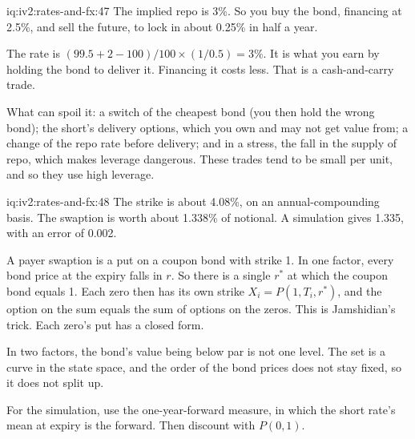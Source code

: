 \begin{solution}{iq:iv2:rates-and-fx:47}
The implied repo is 3\%. So you buy the bond, financing at 2.5\%, and sell the future, to lock in about 0.25\% in half a year.

The rate is $(99.5 + 2 - 100)/100 \times (1/0.5) = 3\%$. It is what you earn by holding the bond to deliver it. Financing it costs less. That is a cash-and-carry trade.

What can spoil it: a switch of the cheapest bond (you then hold the wrong bond); the short's delivery options, which you own and may not get value from; a change of the repo rate before delivery; and in a stress, the fall in the supply of repo, which makes leverage dangerous. These trades tend to be small per unit, and so they use high leverage.

\end{solution}

\begin{solution}{iq:iv2:rates-and-fx:48}
The strike is about 4.08\%, on an annual-compounding basis. The swaption is worth about 1.338\% of notional. A simulation gives 1.335, with an error of 0.002.

A payer swaption is a put on a coupon bond with strike 1. In one factor, every bond price at the expiry falls in $r$. So there is a single $r^*$ at which the coupon bond equals 1. Each zero then has its own strike $X_i = P(1, T_i, r^*)$, and the option on the sum equals the sum of options on the zeros. This is Jamshidian's trick. Each zero's put has a closed form.

In two factors, the bond's value being below par is not one level. The set is a curve in the state space, and the order of the bond prices does not stay fixed, so it does not split up.

For the simulation, use the one-year-forward measure, in which the short rate's mean at expiry is the forward. Then discount with $P(0, 1)$.

\end{solution}

